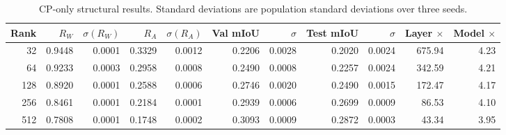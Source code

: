 \begin{table}
\centering
\caption{CP-only structural results. Standard deviations are population standard deviations over three seeds.}
\label{tab:final-cp-structural}
\begin{tabular}{rrrrrrrrrrr}
\toprule
Rank & $R_W$ & $\sigma(R_W)$ & $R_A$ & $\sigma(R_A)$ & Val mIoU & $\sigma$ & Test mIoU & $\sigma$ & Layer $\times$ & Model $\times$ \\
\midrule
32 & 0.9448 & 0.0001 & 0.3329 & 0.0012 & 0.2206 & 0.0028 & 0.2020 & 0.0024 & 675.94 & 4.23 \\
64 & 0.9233 & 0.0003 & 0.2958 & 0.0008 & 0.2490 & 0.0008 & 0.2257 & 0.0024 & 342.59 & 4.21 \\
128 & 0.8920 & 0.0001 & 0.2588 & 0.0006 & 0.2746 & 0.0020 & 0.2490 & 0.0015 & 172.47 & 4.17 \\
256 & 0.8461 & 0.0001 & 0.2184 & 0.0001 & 0.2939 & 0.0006 & 0.2699 & 0.0009 & 86.53 & 4.10 \\
512 & 0.7808 & 0.0001 & 0.1748 & 0.0002 & 0.3093 & 0.0009 & 0.2872 & 0.0003 & 43.34 & 3.95 \\
\bottomrule
\end{tabular}
\end{table}
